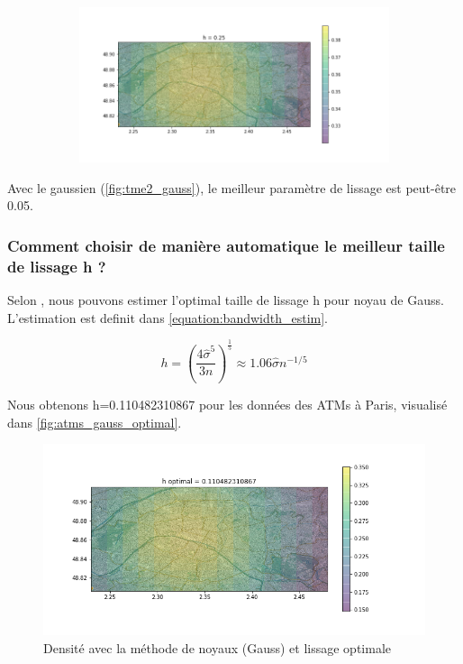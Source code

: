 \documentclass[a4paper,12pt]{article}
\begin{document}
\begin{figure}[h!]
\begin{subfigure}{.24\textwidth}
\end{subfigure}
\begin{subfigure}{.24\textwidth}
  \centering
	\includegraphics[width=\linewidth]{images/tme2/atms_gauss_3.png}
\end{subfigure}
\end{figure}

Avec le gaussien (\autoref{fig:tme2_gauss}), le meilleur paramètre de lissage est peut-être 0.05.

\subsubsection{Comment choisir de manière automatique le meilleur taille de lissage h ?}

Selon \citep{wiki:kernel_density}, nous pouvons estimer l’optimal taille de lissage h pour noyau de Gauss. 
L’estimation est definit dans \autoref{equation:bandwidth_estim}.

\begin{equation}
\label{equation:bandwidth_estim}
h = \left(\frac{4\hat{\sigma}^5}{3n}\right)^{\frac{1}{5}} \approx 1.06 \hat{\sigma} n^{-1/5}
\end{equation}

Nous obtenons h=0.110482310867 pour les données des ATMs à Paris, visualisé dans \autoref{fig:atms_gauss_optimal}.

\begin{figure}[h!]
\caption{Densité avec la méthode de noyaux (Gauss) et lissage optimale}
\label{fig:atms_gauss_optimal}
\centering
\includegraphics[width=0.6\linewidth]{images/tme2/atms_gauss_optimal.png}
\end{figure}%
\end{document}
